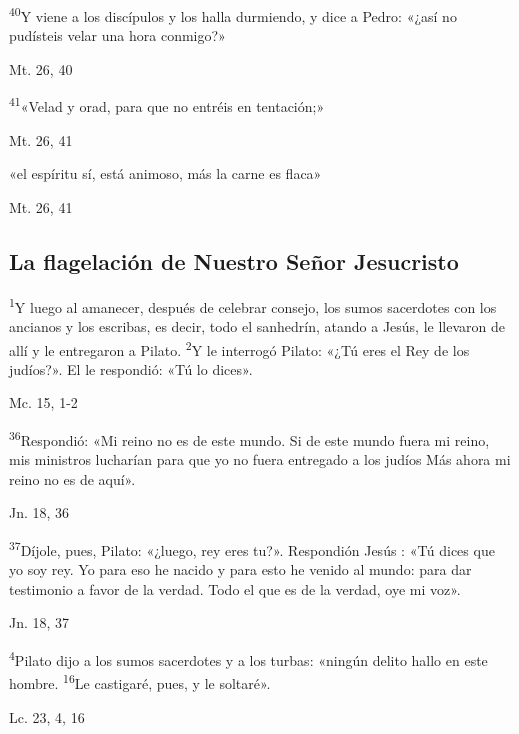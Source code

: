 \documentclass[a4paper,11pt]{article}
\begin{document}
      \textsuperscript{40}Y viene a los discípulos y los halla durmiendo, y dice a Pedro: «¿así no pudísteis velar una hora conmigo?»
      \begin{flushright}
        Mt. 26, 40
      \end{flushright}

      \textsuperscript{41}«Velad y orad, para que no entréis en tentación;»
      \begin{flushright}
        Mt. 26, 41
      \end{flushright}

      «el espíritu sí, está animoso, más la carne es flaca»
      \begin{flushright}
        Mt. 26, 41
      \end{flushright}

    \subsection*{\hfil La flagelación de Nuestro Señor Jesucristo \hfil}
      
      \textsuperscript{1}Y luego al amanecer, después de celebrar consejo, los sumos sacerdotes con los ancianos y los escribas, es decir, todo el sanhedrín, atando a Jesús,
      le llevaron de allí y le entregaron a Pilato. \textsuperscript{2}Y le interrogó Pilato: «¿Tú eres el Rey de los judíos?». El le respondió: «Tú lo dices».
      \begin{flushright}
        Mc. 15, 1-2
      \end{flushright}

      \textsuperscript{36}Respondió: «Mi reino no es de este mundo. Si de este mundo fuera mi reino, mis ministros lucharían para que yo no fuera entregado a los judíos
      Más ahora mi reino no es de aquí».
      \begin{flushright}
        Jn. 18, 36
      \end{flushright}

      \textsuperscript{37}Díjole, pues, Pilato: «¿luego, rey eres tu?». Respondión Jesús : «Tú dices que yo soy rey. Yo para eso he nacido y para esto he venido
      al mundo: para dar testimonio a favor de la verdad. Todo el que es de la verdad, oye mi voz».
      \begin{flushright}
        Jn. 18, 37
      \end{flushright}

      \textsuperscript{4}Pilato dijo a los sumos sacerdotes y a los turbas: «ningún delito hallo en este hombre. \textsuperscript{16}Le castigaré, pues, y le soltaré».
      \begin{flushright}
        Lc. 23, 4, 16
      \end{flushright}
\end{document}

